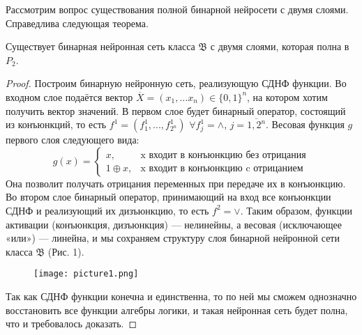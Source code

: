     Рассмотрим вопрос существования полной бинарной нейросети с двумя слоями. Справедлива следующая теорема.
    
    \begin{theorem}
    Существует бинарная нейронная сеть класса $\mathfrak{B}$ с двумя слоями, которая полна в $P_2$.
    \end{theorem}
    
    \begin{proof}
    Построим бинарную нейронную сеть, реализующую СДНФ функции. Во входном слое подаётся вектор $\overline{X} = (x_1, ... x_n)\in \{0, 1\}^n$, на котором хотим получить вектор значений. В первом слое будет бинарный оператор, состоящий из конъюнкций, то есть $f^1 = (f^1_1, ..., f^1_{2^n})$ $\forall f^1_j = \wedge$, $j = \overline{1, 2^n}$. Весовая функция $g$ первого слоя следующего вида: 
    \begin{equation*}
    g(x) =
    \begin{cases}
    x, &\text{x входит в конъюнкцию без отрицания}\\
    1 \oplus x, &\text{x входит в конъюнкцию c отрицанием}
    \end{cases}
    \end{equation*}
    Она позволит получать отрицания переменных при передаче их в конъюнкцию. Во втором слое бинарный оператор, принимающий на вход все конъюнкции СДНФ и реализующий их дизъюнкцию, то есть $f^2 = \vee$. Таким образом, функции активации (конъюнкция, дизъюнкция) — нелинейны, а весовая (исключающее «или») — линейна, и мы сохраняем структуру слоя бинарной нейронной сети класса $\mathfrak{B}$ (Рис. 1).
    
    \begin{figure}[h]
    \begin{center}
    \texttt{[image: picture1.png]}
    \caption{}
    \label{ris:experimcoded}
    \end{center}
    \end{figure}
    
    Так как СДНФ функции конечна и единственна, то по ней мы сможем однозначно восстановить все функции алгебры логики, и такая нейронная сеть будет полна, что и требовалось доказать.
    \end{proof}
    
